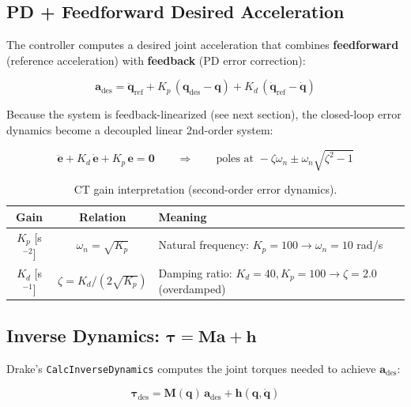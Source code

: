 \documentclass[11pt,a4paper]{article}
\newcommand{\bq}{\bm{q}}
\newcommand{\btau}{\bm{\tau}}
\newcommand{\bM}{\bm{M}}
\newcommand{\bh}{\bm{h}}
\begin{document}
\subsection{PD + Feedforward Desired Acceleration}

The controller computes a desired joint acceleration that combines \textbf{feedforward} (reference acceleration) with \textbf{feedback} (PD error correction):

\begin{equation}
\boxed{
    \bm{a}_{\mathrm{des}} = \ddot{\bq}_{\mathrm{ref}}
        + K_p \, (\bq_{\mathrm{des}} - \bq)
        + K_d \, (\dot{\bq}_{\mathrm{ref}} - \dot{\bq})
}
\label{eq:a_des}
\end{equation}

Because the system is feedback-linearized (see next section), the closed-loop error dynamics become a decoupled linear 2nd-order system:

\begin{equation}
    \ddot{\bm{e}} + K_d \, \dot{\bm{e}} + K_p \, \bm{e} = \bm{0}
    \qquad\Longrightarrow\qquad
    \text{poles at } -\zeta\omega_n \pm \omega_n\sqrt{\zeta^2 - 1}
\label{eq:error_dynamics}
\end{equation}

\begin{table}[H]
\centering
\caption{CT gain interpretation (second-order error dynamics).}
\begin{tabular}{ccl}
\toprule
\textbf{Gain} & \textbf{Relation} & \textbf{Meaning} \\
\midrule
$K_p$ [s$^{-2}$] & $\omega_n = \sqrt{K_p}$ & Natural frequency: $K_p = 100 \to \omega_n = 10$ rad/s \\
$K_d$ [s$^{-1}$] & $\zeta = K_d / (2\sqrt{K_p})$ & Damping ratio: $K_d = 40, K_p = 100 \to \zeta = 2.0$ (overdamped) \\
\bottomrule
\end{tabular}
\end{table}


\subsection{\texorpdfstring{Inverse Dynamics: $\btau = \bM \bm{a} + \bh$}{Inverse Dynamics: tau = M a + h}}

Drake's \texttt{CalcInverseDynamics} computes the joint torques needed to achieve $\bm{a}_{\mathrm{des}}$:

\begin{equation}
\boxed{
    \btau_{\mathrm{des}} = \bM(\bq) \, \bm{a}_{\mathrm{des}} + \bh(\bq, \dot{\bq})
}
\label{eq:inv_dyn}
\end{equation}
\end{document}
